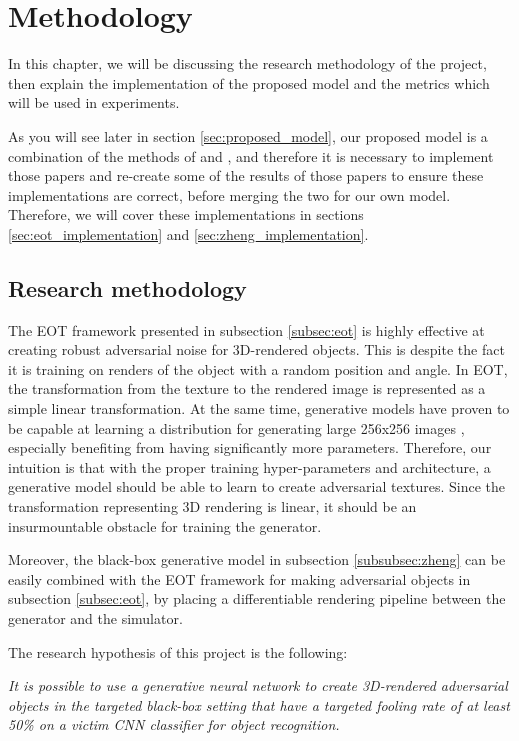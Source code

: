 \chapter{Methodology}
    \label{chap:methodology}
    
In this chapter, we will be discussing the research methodology of the project, then explain the implementation of the proposed model and the metrics which will be used in experiments.

As you will see later in section \ref{sec:proposed_model}, our proposed model is a combination of the methods of \cite{athalye} and \cite{zheng_black_box_GAN}, and therefore it is necessary to implement those papers and re-create some of the results of those papers to ensure these implementations are correct, before merging the two for our own model. Therefore, we will cover these implementations in sections \ref{sec:eot_implementation} and \ref{sec:zheng_implementation}.
    
\section{Research methodology}

The EOT framework presented in subsection \ref{subsec:eot} is highly effective at creating robust adversarial noise for 3D-rendered objects. This is despite the fact it is training on renders of the object with a random position and angle. In EOT, the transformation from the texture to the rendered image is represented as a simple linear transformation. At the same time, generative models have proven to be capable at learning a distribution for generating large 256x256 images \cite{big_gan}, especially benefiting from having significantly more parameters. Therefore, our intuition is that with the proper training hyper-parameters and architecture, a generative model should be able to learn to create adversarial textures. Since the transformation representing 3D rendering is linear, it should be an insurmountable obstacle for training the generator.

Moreover, the black-box generative model in subsection \ref{subsubsec:zheng} can be easily combined with the EOT framework for making adversarial objects in subsection \ref{subsec:eot}, by placing a differentiable rendering pipeline between the generator and the simulator.

\newpage
The research hypothesis of this project is the following: 

\textit{It is possible to use a generative neural network to create 3D-rendered adversarial objects in the targeted black-box setting that have a targeted fooling rate of at least 50\% on a victim CNN classifier for object recognition.}

